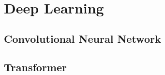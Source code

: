 \section{Deep Learning}\label{sec:deep-learning}
\subsection{Convolutional Neural Network}\label{subsec:conv-neural-network}

\subsection{Transformer}\label{subsec:transformer}
